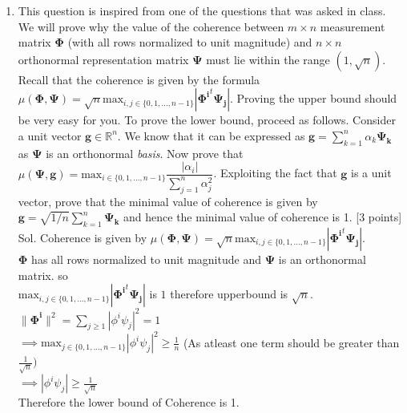 \documentclass[11pt]{article}
\begin{document}
\maketitle


\begin{enumerate}
\item This question is inspired from one of the questions that was asked in class. We will prove why the value of the coherence between $m \times n$ measurement matrix $\mathbf{\Phi}$ (with all rows normalized to unit magnitude) and $n \times n$ orthonormal representation matrix $\mathbf{\Psi}$ must lie within the range $(1,\sqrt{n})$. Recall that the coherence is given by the formula
$\mu(\mathbf{\Phi},\mathbf{\Psi}) = \sqrt{n} \textrm{max}_{i,j \in \{0,1,...,n-1\}} |\mathbf{\Phi^i}^t \mathbf{\Psi_j}|$. 
Proving the upper bound should be very easy for you. To prove the lower bound, proceed as follows. Consider a unit vector $\mathbf{g} \in \mathbb{R}^n$. We know that it can be expressed as $\mathbf{g} = \sum_{k=1}^n \alpha_k \mathbf{\Psi_k}$ as $\mathbf{\Psi}$ is an orthonormal \emph{basis}. Now prove that $\mu(\mathbf{\Psi},\mathbf{g}) = \textrm{max}_{i \in \{0,1,...,n-1\}} \dfrac{|\alpha_i|}{\sum_{j=1}^n \alpha^2_j}$. Exploiting the fact that $\mathbf{g}$ is a unit vector, prove that the minimal value of coherence is given by $\mathbf{g} = \sqrt{1/n} \sum_{k=1}^n \mathbf{\Psi_k}$ and hence the minimal value of coherence is 1. \textsf{[3 points]}\\
Sol. Coherence is given by $\mu(\mathbf{\Phi},\mathbf{\Psi}) = \sqrt{n} \textrm{max}_{i,j \in \{0,1,...,n-1\}} |\mathbf{\Phi^i}^t \mathbf{\Psi_j}|$.\\
$\mathbf{\Phi}$ has all rows normalized to unit magnitude and $\mathbf{\Psi}$ is an orthonormal matrix. so \\
$\textrm{max}_{i,j \in \{0,1,...,n-1\}} |\mathbf{\Phi^i}^t \mathbf{\Psi_j}|$ is $1$ therefore upperbound is $\sqrt{n}$.\\
$\|\mathbf{\Phi^i}\|^2 = \sum_{j \geq 1}|\phi^i\psi_j|^2 = 1$\\
$\implies \textrm{max}_{j \in \{0,1,...,n-1\}}|\phi^i\psi_j|^2 \geq \frac{1}{n}$ (As atleast one term should be greater than $\frac{1}{\sqrt{n}})$\\
$\implies|\phi^i\psi_j| \geq \frac{1}{\sqrt{n}}$\\
Therefore the lower bound of Coherence is 1.


\end{enumerate}
\end{document}
